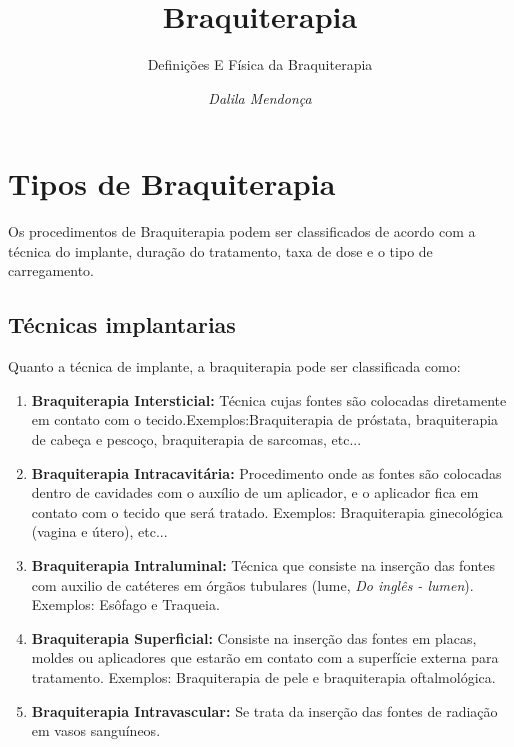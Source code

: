 \documentclass[11pt,a4paper]{article}
\title{Braquiterapia}
\author{Definições E Física da Braquiterapia\nocite{*}}
\date{\textit{Dalila Mendonça}}
\begin{document}
	\maketitle



	\section{Tipos de Braquiterapia}

	Os procedimentos de Braquiterapia podem ser classificados de acordo com a técnica do implante, duração do tratamento, taxa de dose e o tipo de carregamento.

		\subsection{Técnicas implantarias}

			Quanto a técnica de implante, a braquiterapia pode ser classificada como:

		\begin{enumerate}
			\item \textbf{Braquiterapia Intersticial:} Técnica cujas fontes são colocadas diretamente em contato com o tecido.Exemplos:Braquiterapia de próstata, braquiterapia de cabeça e pescoço, braquiterapia de sarcomas, etc...
			
			\item \textbf{Braquiterapia Intracavitária:}  Procedimento onde as fontes são colocadas dentro de cavidades com o auxílio de um aplicador, e o aplicador fica em contato com o tecido que será tratado. Exemplos: Braquiterapia ginecológica (vagina e útero), etc...
			
			
			\item \textbf{Braquiterapia Intraluminal:} Técnica que consiste na inserção das fontes com auxilio de catéteres em órgãos tubulares (lume, \textit{Do inglês - lumen}). Exemplos: Esôfago e Traqueia.
			
			\item \textbf{Braquiterapia Superficial:} Consiste na inserção das fontes em placas, moldes ou aplicadores que estarão em contato com a superfície externa para tratamento. Exemplos: Braquiterapia de pele e braquiterapia oftalmológica.
			
			\item \textbf{Braquiterapia Intravascular:} Se trata da inserção das fontes de radiação em vasos sanguíneos.

		\end{enumerate}
\end{document}
